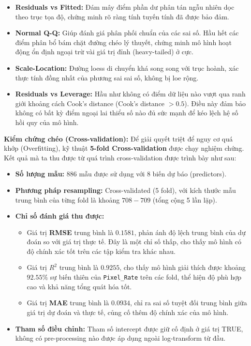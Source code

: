 \begin{itemize}
    \item \textbf{Residuals vs Fitted:} Đám mây điểm phần dư phân tán ngẫu nhiên dọc theo trục tọa độ, chứng minh rõ ràng tính tuyến tính đã được bảo đảm.
    \item \textbf{Normal Q-Q:} Giúp đánh giá phân phối chuẩn của các sai số. Hầu hết các điểm phân bổ bám chặt đường chéo lý thuyết, chứng minh mô hình hoạt động ổn định ngoại trừ vài giá trị đỉnh (heavy-tailed) ở cực.
    \item \textbf{Scale-Location:} Đường loess di chuyển khá song song với trục hoành, xác thực tính đồng nhất của phương sai sai số, không bị loe rộng.
    \item \textbf{Residuals vs Leverage:} Hầu như không có điểm dữ liệu nào vượt qua ranh giới khoảng cách Cook's distance (Cook's distance $> 0.5$). Điều này đảm bảo không có bất kỳ điểm ngoại lai thiểu số nào đủ sức mạnh để kéo lệch hệ số hồi quy của mô hình.
\end{itemize}

\textbf{Kiểm chứng chéo (Cross-validation):}
Để giải quyết triệt để nguy cơ quá khớp (Overfitting), kỹ thuật \textbf{5-fold Cross-validation} được chạy nghiệm chứng. Kết quả mà ta thu được từ quá trình cross-validation được trình bày như sau:
\begin{itemize}
    \item \textbf{Số lượng mẫu:} $886$ mẫu được sử dụng với $8$ biến dự báo (predictors).
    \item \textbf{Phương pháp resampling:} Cross-validated (5 fold), với kích thước mẫu trung bình của từng fold là khoảng $708-709$ (tổng cộng 5 lần lặp).
    \item \textbf{Chỉ số đánh giá thu được:}
    \begin{itemize}
        \item Giá trị \textbf{RMSE} trung bình là $0.1581$, phản ánh độ lệch trung bình của dự đoán so với giá trị thực tế. Đây là một chỉ số thấp, cho thấy mô hình có độ chính xác tốt trên các tập kiểm tra khác nhau.
        \item Giá trị \textbf{$R^2$} trung bình là $0.9255$, cho thấy mô hình giải thích được khoảng $92.55\%$ sự biến thiên của \texttt{Pixel\_Rate} trên các fold, thể hiện độ phù hợp cao và khả năng tổng quát hóa tốt.
        \item Giá trị \textbf{MAE} trung bình là $0.0934$, chỉ ra sai số tuyệt đối trung bình giữa giá trị dự đoán và thực tế, củng cố thêm độ chính xác của mô hình.
    \end{itemize}
    \item \textbf{Tham số điều chỉnh:} Tham số intercept được giữ cố định ở giá trị TRUE, không có pre-processing nào được áp dụng ngoài log-transform từ đầu.
\end{itemize}

